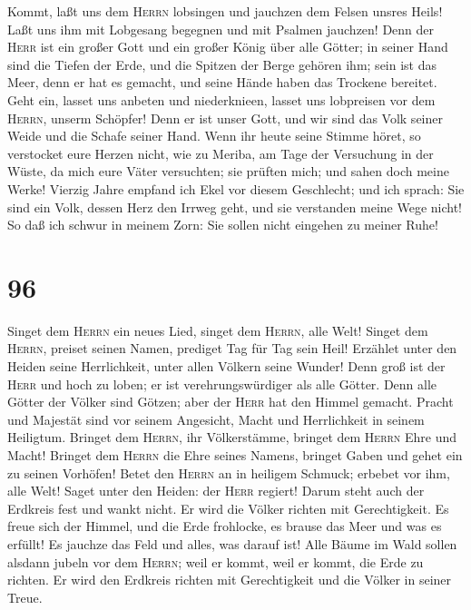  Kommt, laßt uns dem \textsc{Herrn} lobsingen und jauchzen
dem Felsen unsres Heils!  Laßt uns ihm mit Lobgesang
begegnen und mit Psalmen jauchzen!  Denn der \textsc{Herr}
ist ein großer Gott und ein großer König über alle Götter;
 in seiner Hand sind die Tiefen der Erde, und die Spitzen
der Berge gehören ihm;  sein ist das Meer, denn er hat es
gemacht, und seine Hände haben das Trockene bereitet. 
Geht ein, lasset uns anbeten und niederknieen, lasset uns lobpreisen vor
dem \textsc{Herrn}, unserm Schöpfer!  Denn er ist unser
Gott, und wir sind das Volk seiner Weide und die Schafe seiner Hand.
 Wenn ihr heute seine Stimme höret, so verstocket eure
Herzen nicht, wie zu Meriba, am Tage der Versuchung in der Wüste,
 da mich eure Väter versuchten; sie prüften mich; und
sahen doch meine Werke!  Vierzig Jahre empfand ich Ekel
vor diesem Geschlecht; und ich sprach: Sie sind ein Volk, dessen Herz
den Irrweg geht, und sie verstanden meine Wege nicht!  So
daß ich schwur in meinem Zorn: Sie sollen nicht eingehen zu meiner Ruhe!

\hypertarget{section-95}{%
\section{96}\label{section-95}}

 Singet dem \textsc{Herrn} ein neues Lied, singet dem
\textsc{Herrn}, alle Welt!  Singet dem \textsc{Herrn},
preiset seinen Namen, prediget Tag für Tag sein Heil! 
Erzählet unter den Heiden seine Herrlichkeit, unter allen Völkern seine
Wunder!  Denn groß ist der \textsc{Herr} und hoch zu
loben; er ist verehrungswürdiger als alle Götter.  Denn
alle Götter der Völker sind Götzen; aber der \textsc{Herr} hat den
Himmel gemacht.  Pracht und Majestät sind vor seinem
Angesicht, Macht und Herrlichkeit in seinem Heiligtum. 
Bringet dem \textsc{Herrn}, ihr Völkerstämme, bringet dem \textsc{Herrn}
Ehre und Macht!  Bringet dem \textsc{Herrn} die Ehre
seines Namens, bringet Gaben und gehet ein zu seinen Vorhöfen!
 Betet den \textsc{Herrn} an in heiligem Schmuck; erbebet
vor ihm, alle Welt!  Saget unter den Heiden: der
\textsc{Herr} regiert! Darum steht auch der Erdkreis fest und wankt
nicht. Er wird die Völker richten mit Gerechtigkeit.  Es
freue sich der Himmel, und die Erde frohlocke, es brause das Meer und
was es erfüllt!  Es jauchze das Feld und alles, was
darauf ist! Alle Bäume im Wald sollen alsdann jubeln  vor
dem \textsc{Herrn}; weil er kommt, weil er kommt, die Erde zu richten.
Er wird den Erdkreis richten mit Gerechtigkeit und die Völker in seiner
Treue.

